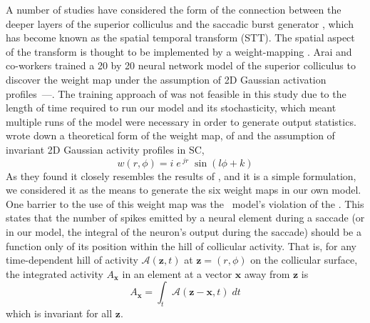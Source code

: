 \documentclass{frontiersSCNS}
\begin{document}
A number of studies have considered the form of the connection between
the deeper layers of the superior colliculus and the saccadic burst
generator \citep{van_gisbergen_experimental_1985,ottes_visuomotor_1986,waitzman_superior_1991,groh_converting_2001,arai_two-dimensional_1994,goossens_dynamic_2006,tabareau_geometry_2007,van_opstal_linear_2008,goossens_optimal_2012},
which has become known as the spatial temporal transform (STT).  The
spatial aspect of the transform is thought to be implemented by a
weight-mapping \citep{tabareau_geometry_2007,arai_two-dimensional_1994}.
%
Arai and co-workers trained a 20 by 20 neural network model of the
superior colliculus to discover the weight map under the assumption of
2D Gaussian activation
profiles~\citep{arai_two-dimensional_1994}---.
%
The training approach of \cite{arai_two-dimensional_1994} was not
feasible in this study due to the length of time required to run our
model and its stochasticity, which meant multiple runs of the model
were necessary in order to generate output statistics.
%
\cite{tabareau_geometry_2007} wrote down a theoretical form of the weight
map,  of \cite{ottes_visuomotor_1986}
and the assumption of invariant 2D Gaussian activity profiles in SC,
%
\begin{equation} \label{eq:tabareau_eq3}
w(r,\phi) = i\;e\,^{jr}\;\sin\left(l\phi + k\right)
\end{equation}
%
As they found it closely resembles the results
of \cite{arai_two-dimensional_1994}, and it is a simple formulation,
we considered it as the means to generate the six weight maps in our
own model.
%
One barrier to the use of this weight map was the \ccg~model's
violation of the
. This states that the number of spikes
emitted by a neural element during a saccade (or in our model, the
integral of the neuron's output during the saccade) should be a
function only of its position within the hill of collicular
activity. That is, for any time-dependent hill of activity
$\mathcal{A}(\mathbf{z},t)$ at $\mathbf{z} = (r,\phi)$ on the collicular
surface, the integrated activity  $A_{\mathbf{x}}$ in an element at a
vector $\mathbf{x}$ away from $\mathbf{z}$ is
\begin{equation}
A_{\mathbf{x}} = \int_t \mathcal{A}(\mathbf{z}-\mathbf{x}, t)\;dt
\end{equation}
which is invariant for all $\mathbf{z}$. 
\end{document}
